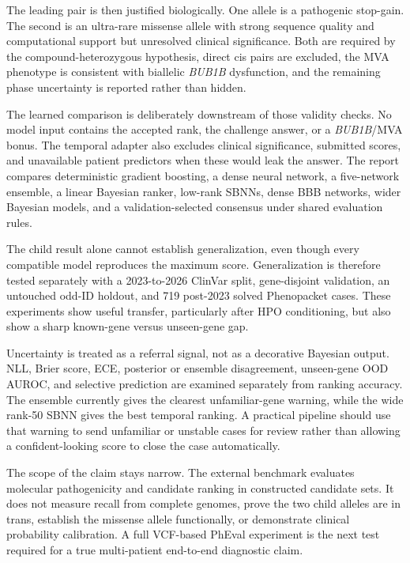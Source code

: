 \documentclass[11pt]{article}
\begin{document}
The leading pair is then justified biologically. One allele is a pathogenic stop-gain. The second is an ultra-rare missense allele with strong sequence quality and computational support but unresolved clinical significance. Both are required by the compound-heterozygous hypothesis, direct cis pairs are excluded, the MVA phenotype is consistent with biallelic \textit{BUB1B} dysfunction, and the remaining phase uncertainty is reported rather than hidden.

The learned comparison is deliberately downstream of those validity checks. No model input contains the accepted rank, the challenge answer, or a \textit{BUB1B}/MVA bonus. The temporal adapter also excludes clinical significance, submitted scores, and unavailable patient predictors when these would leak the answer. The report compares deterministic gradient boosting, a dense neural network, a five-network ensemble, a linear Bayesian ranker, low-rank SBNNs, dense BBB networks, wider Bayesian models, and a validation-selected consensus under shared evaluation rules.

The child result alone cannot establish generalization, even though every compatible model reproduces the maximum score. Generalization is therefore tested separately with a 2023-to-2026 ClinVar split, gene-disjoint validation, an untouched odd-ID holdout, and 719 post-2023 solved Phenopacket cases. These experiments show useful transfer, particularly after HPO conditioning, but also show a sharp known-gene versus unseen-gene gap.

Uncertainty is treated as a referral signal, not as a decorative Bayesian output. NLL, Brier score, ECE, posterior or ensemble disagreement, unseen-gene OOD AUROC, and selective prediction are examined separately from ranking accuracy. The ensemble currently gives the clearest unfamiliar-gene warning, while the wide rank-50 SBNN gives the best temporal ranking. A practical pipeline should use that warning to send unfamiliar or unstable cases for review rather than allowing a confident-looking score to close the case automatically.

The scope of the claim stays narrow. The external benchmark evaluates molecular pathogenicity and candidate ranking in constructed candidate sets. It does not measure recall from complete genomes, prove the two child alleles are in trans, establish the missense allele functionally, or demonstrate clinical probability calibration. A full VCF-based PhEval experiment is the next test required for a true multi-patient end-to-end diagnostic claim.
\end{document}
